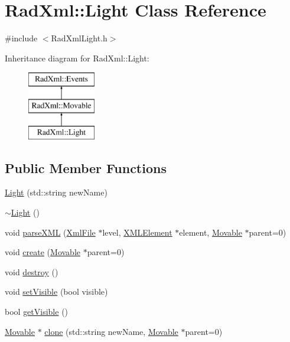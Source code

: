 \hypertarget{class_rad_xml_1_1_light}{\section{Rad\-Xml\-:\-:Light Class Reference}
\label{class_rad_xml_1_1_light}
}


{\ttfamily \#include $<$Rad\-Xml\-Light.\-h$>$}

Inheritance diagram for Rad\-Xml\-:\-:Light\-:\begin{figure}[H]
\begin{center}
\leavevmode
\includegraphics[height=3.000000cm]{class_rad_xml_1_1_light}
\end{center}
\end{figure}
\subsection*{Public Member Functions}
\begin{DoxyCompactItemize}
\item 
\hyperlink{class_rad_xml_1_1_light_a3a0d43eb5c5ac6b17c3b630aac19866a}{Light} (std\-::string new\-Name)
\item 
\hyperlink{class_rad_xml_1_1_light_a9e7eae1f315d4a78677469831199fdbf}{$\sim$\-Light} ()
\item 
void \hyperlink{class_rad_xml_1_1_light_a12b067c2eb22dabbaa8d7098dbf82c8b}{parse\-X\-M\-L} (\hyperlink{class_rad_xml_1_1_xml_file}{Xml\-File} $\ast$level, \hyperlink{class_x_m_l_element}{X\-M\-L\-Element} $\ast$element, \hyperlink{class_rad_xml_1_1_movable}{Movable} $\ast$parent=0)
\item 
void \hyperlink{class_rad_xml_1_1_light_a01fc4e5940668d57a0962f41d053bc1a}{create} (\hyperlink{class_rad_xml_1_1_movable}{Movable} $\ast$parent=0)
\item 
void \hyperlink{class_rad_xml_1_1_light_a51665dc101abe7ea324c4374749f86d1}{destroy} ()
\item 
void \hyperlink{class_rad_xml_1_1_light_a8baa98e6b3359fee051cfb8fbf6ae634}{set\-Visible} (bool visible)
\item 
bool \hyperlink{class_rad_xml_1_1_light_a464dcc2cbc84c6277bd6244edc0f5623}{get\-Visible} ()
\item 
\hyperlink{class_rad_xml_1_1_movable}{Movable} $\ast$ \hyperlink{class_rad_xml_1_1_light_a194a454ee3585d334db5cbf9d41e2793}{clone} (std\-::string new\-Name, \hyperlink{class_rad_xml_1_1_movable}{Movable} $\ast$parent=0)
\end{DoxyCompactItemize}
